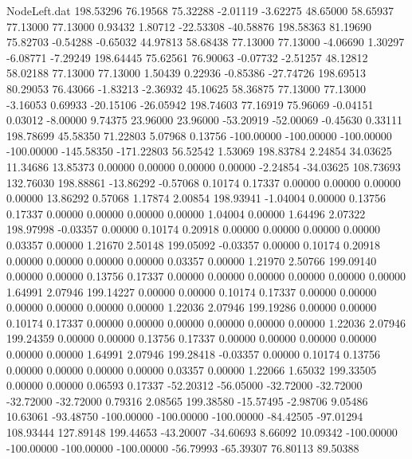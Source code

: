 \begin{filecontents}{NodeLeft.dat}
 198.53296   76.19568   75.32288    -2.01119   -3.62275   48.65000   58.65937   77.13000   77.13000    0.93432    1.80712  -22.53308  -40.58876
 198.58363   81.19690   75.82703    -0.54288   -0.65032   44.97813   58.68438   77.13000   77.13000   -4.06690    1.30297   -6.08771   -7.29249
 198.64445   75.62561   76.90063    -0.07732   -2.51257   48.12812   58.02188   77.13000   77.13000    1.50439    0.22936   -0.85386  -27.74726
 198.69513   80.29053   76.43066    -1.83213   -2.36932   45.10625   58.36875   77.13000   77.13000   -3.16053    0.69933  -20.15106  -26.05942
 198.74603   77.16919   75.96069    -0.04151    0.03012   -8.00000    9.74375   23.96000   23.96000  -53.20919  -52.00069   -0.45630    0.33111
 198.78699   45.58350   71.22803     5.07968    0.13756 -100.00000 -100.00000 -100.00000 -100.00000 -145.58350 -171.22803   56.52542    1.53069
 198.83784    2.24854   34.03625    11.34686   13.85373    0.00000    0.00000    0.00000    0.00000   -2.24854  -34.03625  108.73693  132.76030
 198.88861  -13.86292   -0.57068     0.10174    0.17337    0.00000    0.00000    0.00000    0.00000   13.86292    0.57068    1.17874    2.00854
 198.93941   -1.04004    0.00000     0.13756    0.17337    0.00000    0.00000    0.00000    0.00000    1.04004    0.00000    1.64496    2.07322
 198.97998   -0.03357    0.00000     0.10174    0.20918    0.00000    0.00000    0.00000    0.00000    0.03357    0.00000    1.21670    2.50148
 199.05092   -0.03357    0.00000     0.10174    0.20918    0.00000    0.00000    0.00000    0.00000    0.03357    0.00000    1.21970    2.50766
 199.09140    0.00000    0.00000     0.13756    0.17337    0.00000    0.00000    0.00000    0.00000    0.00000    0.00000    1.64991    2.07946
 199.14227    0.00000    0.00000     0.10174    0.17337    0.00000    0.00000    0.00000    0.00000    0.00000    0.00000    1.22036    2.07946
 199.19286    0.00000    0.00000     0.10174    0.17337    0.00000    0.00000    0.00000    0.00000    0.00000    0.00000    1.22036    2.07946
 199.24359    0.00000    0.00000     0.13756    0.17337    0.00000    0.00000    0.00000    0.00000    0.00000    0.00000    1.64991    2.07946
 199.28418   -0.03357    0.00000     0.10174    0.13756    0.00000    0.00000    0.00000    0.00000    0.03357    0.00000    1.22066    1.65032
 199.33505    0.00000    0.00000     0.06593    0.17337  -52.20312  -56.05000  -32.72000  -32.72000  -32.72000  -32.72000    0.79316    2.08565
 199.38580  -15.57495   -2.98706     9.05486   10.63061  -93.48750 -100.00000 -100.00000 -100.00000  -84.42505  -97.01294  108.93444  127.89148
 199.44653  -43.20007  -34.60693     8.66092   10.09342 -100.00000 -100.00000 -100.00000 -100.00000  -56.79993  -65.39307   76.80113   89.50388

\end{filecontents}

